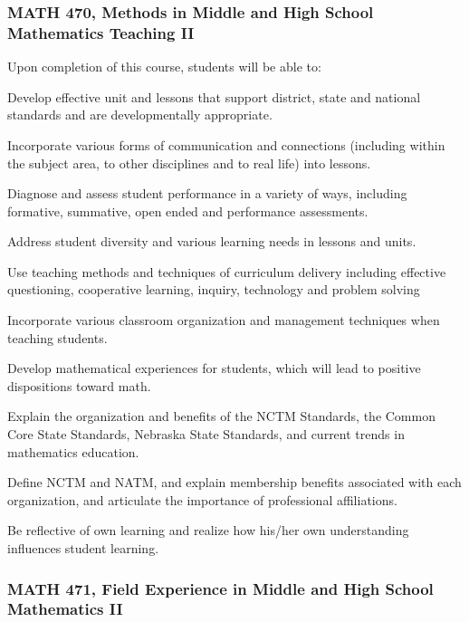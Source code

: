 \subsubsection*{MATH 470, Methods in Middle and High School Mathematics Teaching II}

Upon completion of this course, students will be able to:
\begin{alphalist}
\item Develop effective unit and lessons that support district, state and national standards and are developmentally appropriate.
\item Incorporate various forms of communication and connections (including within the subject area, to other disciplines and to real life) into lessons.
\item Diagnose and assess student performance in a variety of ways, including formative, summative, open ended and performance assessments.
\item Address student diversity and various learning needs in lessons and units.
\item Use teaching methods and techniques of curriculum delivery including effective questioning, cooperative learning, inquiry, technology and problem solving
\item Incorporate various classroom organization and management techniques when teaching students.
\item Develop mathematical experiences for students, which will lead to positive dispositions toward math.
 \item Explain the organization and benefits of the NCTM Standards, the Common Core State Standards, Nebraska State Standards, and current trends in mathematics education.
\item Define NCTM and NATM, and explain membership benefits associated with each organization, and articulate the importance of professional affiliations.
\item Be reflective of own learning and realize how his/her own understanding influences student learning.
\end{alphalist}

\subsubsection{MATH 471, Field Experience in Middle and High School Mathematics II}

